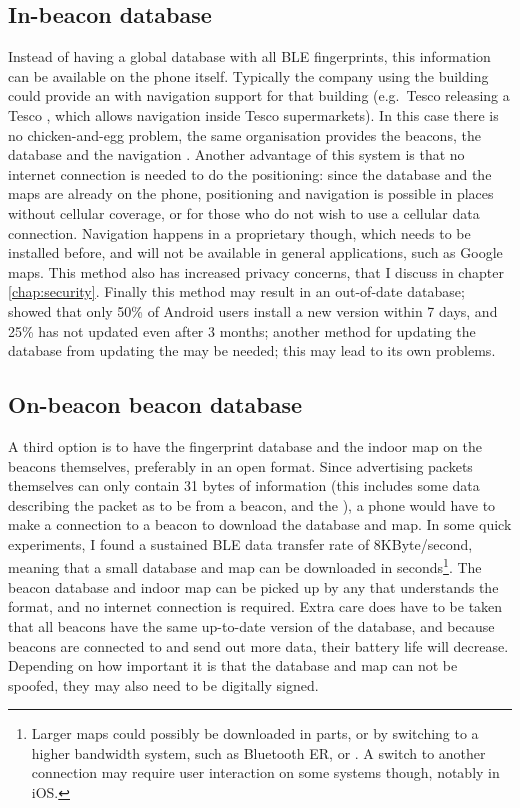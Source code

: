 \subsection{In-\app beacon database}
\label{sec:architecture-in-app-database}
Instead of having a global database with all BLE fingerprints, this information can be available on the phone itself.
Typically the company using the building could provide an \app with navigation support for that building (e.g.\ Tesco releasing a Tesco \app, which allows navigation inside Tesco supermarkets).
In this case there is no chicken-and-egg problem, the same organisation provides the beacons, the database and the navigation \app.
Another advantage of this system is that no internet connection is needed to do the positioning: since the database and the maps are already on the phone, positioning and navigation is possible in places without cellular coverage, or for those who do not wish to use a cellular data connection.
Navigation happens in a proprietary \app though, which needs to be installed before, and will not be available in general applications, such as Google maps.
This method also has increased privacy concerns, that I discuss in chapter \ref{chap:security}.
Finally this method may result in an out-of-date database; \citet{moller2012update} showed that only 50\% of Android users install a new \app version within 7 days, and 25\% has not updated even after 3 months; another method for updating the database from updating the \app may be needed; this may lead to its own problems.

\subsection{On-beacon beacon database}
A third option is to have the fingerprint database and the indoor map on the beacons themselves, preferably in an open format.
Since advertising packets themselves can only contain 31 bytes of information (this includes some data describing the packet as to be from a beacon, and the \bid), a phone would have to make a connection to a beacon to download the database and map.
In some quick experiments, I found a sustained BLE data transfer rate of 8KByte/second, meaning that a small database and map can be downloaded in seconds\footnote{Larger maps could possibly be downloaded in parts, or by switching to a higher bandwidth system, such as Bluetooth ER, or \wifi. A switch to another connection may require user interaction on some systems though, notably in iOS.}.
The beacon database and indoor map can be picked up by any \app that understands the format, and no internet connection is required.
Extra care does have to be taken that all beacons have the same up-to-date version of the database, and because beacons are connected to and send out more data, their battery life will decrease.
Depending on how important it is that the database and map can not be spoofed, they may also need to be digitally signed.

